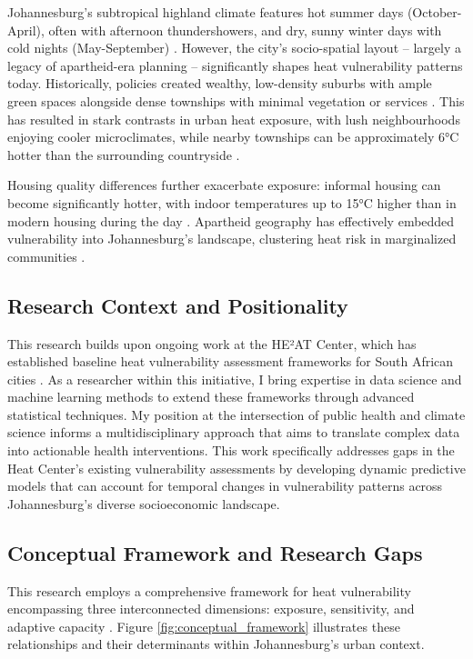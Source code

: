 Johannesburg's subtropical highland climate features hot summer days (October-April), often with afternoon thundershowers, and dry, sunny winter days with cold nights (May-September) \citep{Tyson2000}. However, the city's socio-spatial layout -- largely a legacy of apartheid-era planning -- significantly shapes heat vulnerability patterns today. Historically, policies created wealthy, low-density suburbs with ample green spaces alongside dense townships with minimal vegetation or services \citep{Giombini2022, Venter2020}. This has resulted in stark contrasts in urban heat exposure, with lush neighbourhoods enjoying cooler microclimates, while nearby townships can be approximately 6°C hotter than the surrounding countryside \citep{WorldBank2024, Habitat2023}.

Housing quality differences further exacerbate exposure: informal housing can become significantly hotter, with indoor temperatures up to 15°C higher than in modern housing during the day \citep{Naicker2017}. Apartheid geography has effectively embedded vulnerability into Johannesburg's landscape, clustering heat risk in marginalized communities \citep{Strauss2019}.

\subsection{Research Context and Positionality}
This research builds upon ongoing work at the HE²AT Center, which has established baseline heat vulnerability assessment frameworks for South African cities \citep{Jack}. As a researcher within this initiative, I bring expertise in data science and machine learning methods to extend these frameworks through advanced statistical techniques. My position at the intersection of public health and climate science informs a multidisciplinary approach that aims to translate complex data into actionable health interventions. This work specifically addresses gaps in the Heat Center's existing vulnerability assessments by developing dynamic predictive models that can account for temporal changes in vulnerability patterns across Johannesburg's diverse socioeconomic landscape.

\subsection{Conceptual Framework and Research Gaps}

This research employs a comprehensive framework for heat vulnerability encompassing three interconnected dimensions: exposure, sensitivity, and adaptive capacity \citep{IPCC2022}. Figure \ref{fig:conceptual_framework} illustrates these relationships and their determinants within Johannesburg's urban context.

